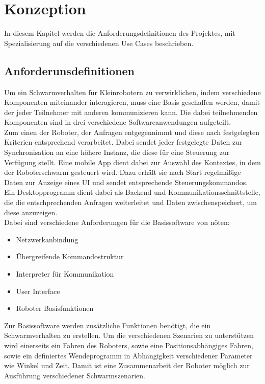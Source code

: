 \color{process}

\section{Konzeption}

In diesem Kapitel werden die Anforderungsdefinitionen des Projektes, mit Spezialisierung auf die verschiedenen Use Cases beschrieben.

\subsection{Anforderunsdefinitionen}

Um ein Schwarmverhalten für Kleinrobotern zu verwirklichen, indem verschiedene Komponenten miteinander interagieren, muss eine Basis geschaffen werden, damit der jeder Teilnehmer mit anderen kommunizieren kann. Die dabei teilnehmenden Komponenten sind in drei verschiedene Softwareanwendungen aufgeteilt.\\ 
Zum einen der Roboter, der Anfragen entgegennimmt und diese nach festgelegten Kriterien entsprechend verarbeitet. Dabei sendet jeder festgelegte Daten zur Synchronisation an eine höhere Instanz, die diese für eine Steuerung zur Verfügung stellt. Eine mobile App dient dabei zur Auswahl des Kontextes, in dem der Roboterschwarm gesteuert wird. Dazu erhält sie nach Start regelmäßige Daten zur Anzeige eines UI und sendet entsprechende Steuerungskommandos. Ein Desktopprogramm dient dabei als Backend und Kommunikationsschnittstelle, die die entschprechenden Anfragen weiterleitet und Daten zwischenspeichert, um diese anzuzeigen.\\
Dabei sind verschiedene Anforderungen für die Basissoftware von nöten:

\begin{itemize}
	\item Netzwerkanbindung
	\item Übergreifende Kommandostruktur
	\item Interpreter für Kommunikation
	\item User Interface
	\item Roboter Basisfunktionen
\end{itemize}

Zur Basissoftware werden zusätzliche Funktionen benötigt, die ein Schwarmverhalten zu erstellen. Um die verschiedenen Szenarien zu unterstützen wird einerseits ein Fahren des Roboters, sowie eine Positionsabhängiges Fahren, sowie ein definiertes Wendeprogramm in Abhängigkeit verschiedener Parameter wie Winkel und Zeit. Damit ist eine Zusammenarbeit der Roboter möglich zur Ausführung verschiedener Schwarmszenarien.

